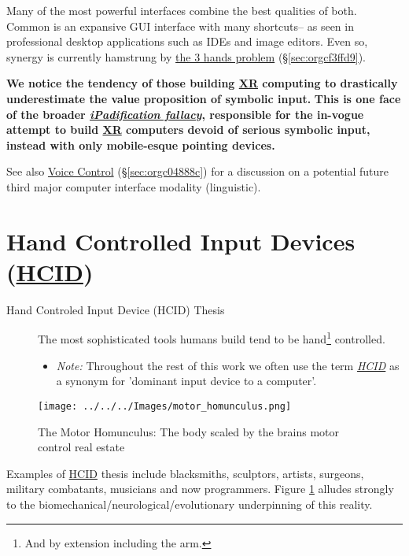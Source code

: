 \documentclass[logo,bsc,singlespacing,parskip]{infthesis}
\begin{document}
Many of the most powerful interfaces combine the best qualities of both.
Common is an expansive GUI interface with many shortcuts-- as seen in professional desktop applications such as IDEs and image editors.
Even so, synergy is currently hamstrung by \hyperref[sec:orgcf3ffd9]{the 3 hands problem} (\S \ref{sec:orgcf3ffd9}).

\textbf{We notice the tendency of those building \hyperref[org88b0f70]{XR} computing to drastically underestimate the value proposition of symbolic input.}
\textbf{This is one face of the broader \emph{\hyperref[ipadification fallacy]{iPadification fallacy}}, responsible for the in-vogue attempt to build \hyperref[org88b0f70]{XR} computers devoid of serious symbolic input, instead with only mobile-esque pointing devices.}

See also \hyperref[sec:orgc04888c]{Voice Control} (\S \ref{sec:orgc04888c}) for a discussion on a potential future third major computer interface modality (linguistic).

\section{Hand Controlled Input Devices (\hyperref[orgf95a76e]{HCID})}
\label{sec:org832b407}
\begin{mdframed}
\begin{description}
\item[{Hand Controled Input Device (\label{orgf95a76e}HCID) Thesis}] The most sophisticated tools humans build tend to be hand\footnote{And by extension including the arm.} controlled.
\begin{itemize}
\item \emph{Note:} Throughout the rest of this work we often use the term \emph{\hyperref[orgf95a76e]{HCID}} as a synonym for 'dominant input device to a computer'.
\end{itemize}
\end{description}
\end{mdframed}

\begin{figure}[h]
\centering
\texttt{[image: ../../../Images/motor\_homunculus.png]}
\caption{\label{fig:motohomo}The Motor Homunculus: The body scaled by the brains motor control real estate}
\end{figure}

Examples of \hyperref[orgf95a76e]{HCID} thesis include blacksmiths, sculptors, artists, surgeons, military combatants, musicians and now programmers.
Figure \ref{fig:motohomo} alludes strongly to the biomechanical/neurological/evolutionary underpinning of this reality.
\end{document}
